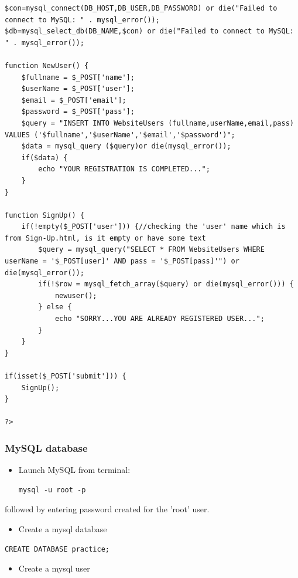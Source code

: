 \documentclass[9pt,b5paper]{article}
\begin{document}
\begin{itemize}
\begin{lstlisting}
$con=mysql_connect(DB_HOST,DB_USER,DB_PASSWORD) or die("Failed to connect to MySQL: " . mysql_error()); 
$db=mysql_select_db(DB_NAME,$con) or die("Failed to connect to MySQL: " . mysql_error()); 

function NewUser() {
	$fullname = $_POST['name']; 
	$userName = $_POST['user']; 
	$email = $_POST['email']; 
	$password = $_POST['pass']; 
	$query = "INSERT INTO WebsiteUsers (fullname,userName,email,pass) VALUES ('$fullname','$userName','$email','$password')"; 
	$data = mysql_query ($query)or die(mysql_error()); 
	if($data) {
		echo "YOUR REGISTRATION IS COMPLETED..."; 
	}
}

function SignUp() {
	if(!empty($_POST['user'])) {//checking the 'user' name which is from Sign-Up.html, is it empty or have some text
		$query = mysql_query("SELECT * FROM WebsiteUsers WHERE userName = '$_POST[user]' AND pass = '$_POST[pass]'") or die(mysql_error()); 
		if(!$row = mysql_fetch_array($query) or die(mysql_error())) {
			newuser(); 
		} else {
			echo "SORRY...YOU ARE ALREADY REGISTERED USER..."; 
		}
	}
}

if(isset($_POST['submit'])) {
	SignUp(); 
}

?>
\end{lstlisting}
\end{itemize}

\subsubsection{MySQL database}
\label{sec-1-1-2}
\begin{itemize}
\item Launch MySQL from terminal: 

\lstset{language=php,label= ,caption= ,numbers=none}
\begin{lstlisting}
mysql -u root -p
\end{lstlisting}
\end{itemize}

followed by entering password created for the 'root' user. 
\begin{itemize}
\item Create a mysql database
\end{itemize}

\lstset{language=SQL,label= ,caption= ,numbers=none}
\begin{lstlisting}
CREATE DATABASE practice;
\end{lstlisting}

\begin{itemize}
\item Create a mysql user
\end{itemize}
\end{document}
